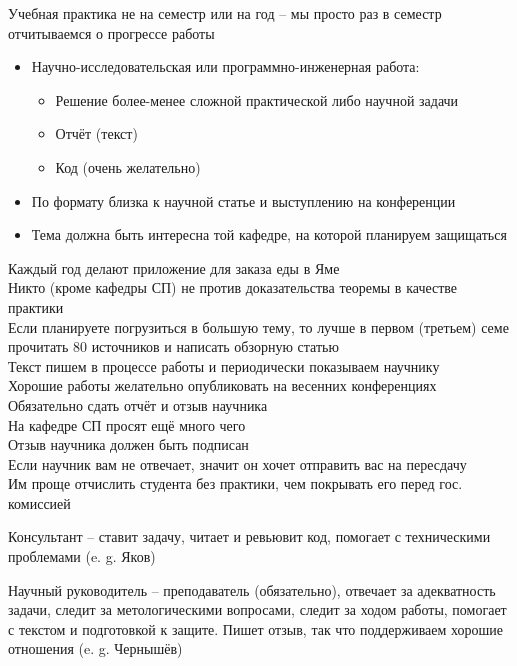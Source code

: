 Учебная практика не на семестр или на год -- мы просто раз в семестр отчитываемся о прогрессе работы

\begin{itemize}
	\item Научно-исследовательская или программно-инженерная работа:
	\begin{itemize}
		\item Решение более-менее сложной практической либо научной задачи
		\item Отчёт (текст)
		\item Код (очень желательно)
	\end{itemize}
	\item По формату близка к научной статье и выступлению на конференции
	\item Тема должна быть интересна той кафедре, на которой планируем защищаться
\end{itemize}

Каждый год делают приложение для заказа еды в Яме \\
Никто (кроме кафедры СП) не против доказательства теоремы в качестве практики \\
Если планируете погрузиться в большую тему, то лучше в первом (третьем) семе прочитать 80 источников и написать обзорную статью \\
Текст пишем в процессе работы и периодически показываем научнику \\
Хорошие работы желательно опубликовать на весенних конференциях \\
Обязательно сдать отчёт и отзыв научника \\
На кафедре СП просят ещё много чего \\
Отзыв научника должен быть подписан \\
Если научник вам не отвечает, значит он хочет отправить вас на пересдачу \\
Им проще отчислить студента без практики, чем покрывать его перед гос. комиссией

\begin{definition}
	Консультант -- ставит задачу, читает и ревьювит код, помогает с техническими проблемами (e. g. Яков)
\end{definition}

\begin{definition}
	Научный руководитель -- преподаватель (обязательно), отвечает за адекватность задачи, следит за метологическими вопросами, следит за ходом работы, помогает с текстом и подготовкой к защите. Пишет отзыв, так что поддерживаем хорошие отношения (e. g. Чернышёв)
\end{definition}

